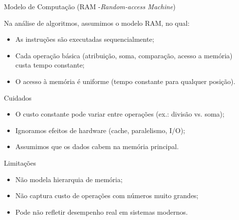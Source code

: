 \documentclass{beamer}
\begin{document}
\begin{frame}{Modelo de Computação (RAM -\textit{Random-access Machine})}


Na análise de algoritmos, assumimos o modelo RAM, no qual:
\begin{itemize}
    \item As instruções são executadas sequencialmente;
    \item Cada operação básica (atribuição, soma, comparação, acesso a memória) custa tempo constante;
    \item O acesso à memória é uniforme (tempo constante para qualquer posição).
\end{itemize}


\begin{block}{Cuidados}
\begin{itemize}
    \item O custo constante pode variar entre operações (ex.: divisão vs. soma);
    \item Ignoramos efeitos de hardware (cache, paralelismo, I/O);
    \item Assumimos que os dados cabem na memória principal.
\end{itemize}
\end{block}

\begin{alertblock}{Limitações}
\begin{itemize}
    \item Não modela hierarquia de memória;
    \item Não captura custo de operações com números muito grandes;
    \item Pode não refletir desempenho real em sistemas modernos.
\end{itemize}
\end{alertblock}

\end{frame}
\end{document}
